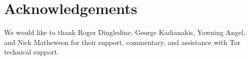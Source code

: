 \documentclass[USenglish,oneside,twocolumn]{article}
\begin{document}
\section{Acknowledgements}

We would like to thank Roger Dingledine, George Kadianakis, Yawning Angel, and Nick Mathewson for their support, commentary, and assistance with Tor technical support.
%
%
%
%
%
%
\end{document}
